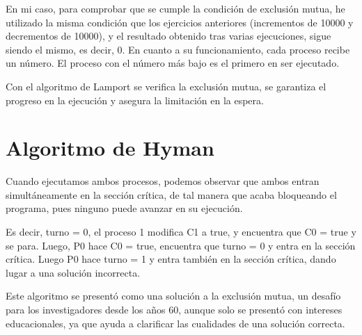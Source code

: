 \documentclass{article}
\begin{document}
En mi caso, para comprobar que se cumple la condición de exclusión mutua, he utilizado la misma condición que los ejercicios anteriores (incrementos de 10000 y decrementos de 10000), y el resultado obtenido tras varias ejecuciones, sigue siendo el mismo, es decir, 0.
\hfill \break
\hfill \break
En cuanto a su funcionamiento, cada proceso recibe un número. El proceso con el número más bajo es el primero en ser ejecutado.

Con el algoritmo de Lamport se verifica la exclusión mutua, se garantiza el progreso en la ejecución y asegura la limitación en la espera.


\section{Algoritmo de Hyman}
Cuando ejecutamos ambos procesos, podemos observar que ambos entran simultáneamente en la sección crítica, de tal manera que acaba bloqueando el programa, pues ninguno puede avanzar en su ejecución.

Es decir, turno = 0, el proceso 1 modifica C1 a true, y encuentra que C0 = true y se para. Luego, P0 hace C0 = true, encuentra que turno = 0 y entra en la sección crítica. Luego P0 hace turno = 1 y entra también en la sección crítica, dando lugar a una solución incorrecta.


Este algoritmo se presentó como una solución a la exclusión mutua, un desafío para los investigadores desde los años 60, aunque solo se presentó con intereses educacionales, ya que ayuda a clarificar las cualidades de una solución correcta.
\end{document}
